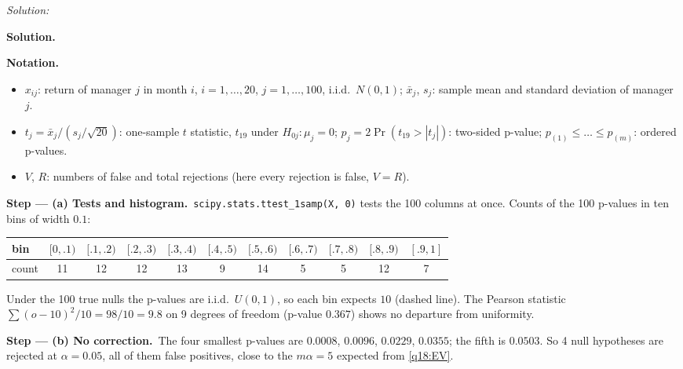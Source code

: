 \documentclass[11pt,a4paper]{article}
\newif\ifsolucoes
\newcommand{\espacoresol}{4.5cm}   %
\numberwithin{equation}{questao}   %
\newenvironment{notacao}{\par\smallskip\noindent\textbf{Notation.}\begin{itemize}[leftmargin=1.4em,topsep=1pt,itemsep=0pt]\small}{\end{itemize}}
\newcommand{\resolespaco}{\ifsolucoes\else\par\textit{Solution:}\vspace{\espacoresol}\par\fi}
\newcommand{\passo}[2]{\par\smallskip\noindent\textbf{Step --- #1.}~#2}
\newcommand{\solhead}{\par\medskip\noindent{\color{blue!55!black}\rule{\linewidth}{0.3pt}}\par\noindent\textbf{Solution.}}
\begin{document}
\resolespaco
\begin{sol}
\solhead
\begin{notacao}
\item $x_{ij}$: return of manager $j$ in month $i$, $i=1,\dots,20$, $j=1,\dots,100$, i.i.d.\ $N(0,1)$;
  $\bar x_j$, $s_j$: sample mean and standard deviation of manager $j$.
\item $t_j=\bar x_j/(s_j/\sqrt{20})$: one-sample $t$ statistic, $t_{19}$ under $H_{0j}:\mu_j=0$;
  $p_j=2\Pr(t_{19}>|t_j|)$: two-sided p-value; $p_{(1)}\le\dots\le p_{(m)}$: ordered p-values.
\item $V$, $R$: numbers of false and total rejections (here every rejection is false, $V=R$).
\end{notacao}

\passo{(a) Tests and histogram}{\texttt{scipy.stats.ttest\_1samp(X, 0)} tests the 100 columns at
once. Counts of the 100 p-values in ten bins of width $0.1$:}
\begin{center}\footnotesize\setlength{\tabcolsep}{2.6pt}
\begin{tabular}{lcccccccccc}
\toprule
bin & $[0,.1)$ & $[.1,.2)$ & $[.2,.3)$ & $[.3,.4)$ & $[.4,.5)$ & $[.5,.6)$ & $[.6,.7)$ & $[.7,.8)$ & $[.8,.9)$ & $[.9,1]$\\
\midrule
count & 11 & 12 & 12 & 13 & 9 & 14 & 5 & 5 & 12 & 7\\
\bottomrule
\end{tabular}
\end{center}
\begin{center}
\end{center}
Under the 100 true nulls the p-values are i.i.d.\ $U(0,1)$, so each bin expects $10$ (dashed line). The
Pearson statistic $\sum(o-10)^2/10=98/10=9.8$ on 9 degrees of freedom (p-value $0.367$) shows no
departure from uniformity.

\passo{(b) No correction}{The four smallest p-values are $0.0008$, $0.0096$, $0.0229$, $0.0355$; the
fifth is $0.0503$. So 4 null hypotheses are rejected at $\alpha=0.05$, all of them false positives,
close to the $m\alpha=5$ expected from \eqref{q18:EV}.}


\end{sol}
\end{document}
